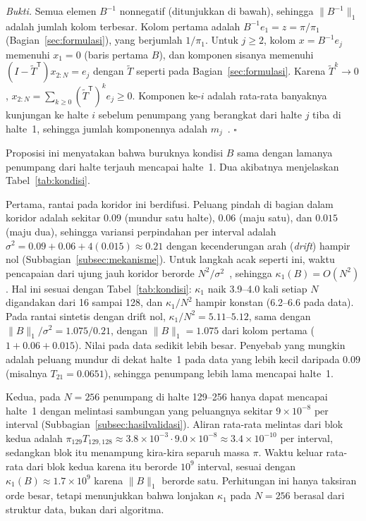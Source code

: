 \documentclass[12pt,a4paper]{article}
\newcommand{\T}{\mathsf{T}}
\numberwithin{equation}{section}
\begin{document}
\smallskip\noindent\emph{Bukti.}
Semua elemen $B^{-1}$ nonnegatif (ditunjukkan di bawah), sehingga $\lVert B^{-1}\rVert_1$ adalah jumlah kolom terbesar.
Kolom pertama adalah $B^{-1}e_1=z=\pi/\pi_1$ (Bagian~\ref{sec:formulasi}), yang berjumlah $1/\pi_1$. Untuk $j\ge2$, kolom
$x=B^{-1}e_j$ memenuhi $x_1=0$ (baris pertama $B$), dan komponen sisanya memenuhi
$(I-\widetilde T^\T)x_{2:N}=e_j$ dengan $\widetilde T$ seperti pada Bagian~\ref{sec:formulasi}. Karena $\widetilde T^k\to0$,
$x_{2:N}=\sum_{k\ge0}(\widetilde T^\T)^ke_j\ge0$. Komponen ke-$i$ adalah rata-rata banyaknya kunjungan ke halte $i$
sebelum penumpang yang berangkat dari halte $j$ tiba di halte~1, sehingga jumlah komponennya adalah $m_j$~\cite{norris}.
\hfill$\square$

\medskip
Proposisi ini menyatakan bahwa buruknya kondisi $B$ sama dengan lamanya penumpang dari halte terjauh mencapai halte~1.
Dua akibatnya menjelaskan Tabel~\ref{tab:kondisi}.

Pertama, rantai pada koridor ini berdifusi. Peluang pindah di bagian dalam koridor adalah sekitar $0.09$ (mundur satu
halte), $0.06$ (maju satu), dan $0.015$ (maju dua), sehingga variansi perpindahan per interval adalah
$\sigma^2=0.09+0.06+4(0.015)\approx0.21$ dengan kecenderungan arah (\emph{drift}) hampir nol
(Subbagian~\ref{subsec:mekanisme}). Untuk langkah acak seperti ini, waktu pencapaian dari ujung jauh koridor
berorde $N^2/\sigma^2$~\cite{norris}, sehingga $\kappa_1(B)=O(N^2)$. Hal ini sesuai dengan Tabel~\ref{tab:kondisi}:
$\kappa_1$ naik 3.9--4.0 kali setiap $N$ digandakan dari 16 sampai 128, dan $\kappa_1/N^2$ hampir konstan (6.2--6.6 pada data). Pada rantai
sintetis dengan drift nol, $\kappa_1/N^2=5.11$--$5.12$, sama dengan $\lVert B\rVert_1/\sigma^2=1.075/0.21$, dengan $\lVert B\rVert_1=1.075$ dari kolom pertama
($1+0.06+0.015$). Nilai pada data sedikit lebih besar. Penyebab yang mungkin adalah peluang mundur di dekat halte~1 pada
data yang lebih kecil daripada $0.09$ (misalnya $T_{21}=0.0651$), sehingga penumpang lebih lama mencapai halte~1.

Kedua, pada $N=256$ penumpang di halte 129--256 hanya dapat mencapai halte~1 dengan melintasi sambungan yang peluangnya
sekitar $9\times10^{-8}$ per interval (Subbagian~\ref{subsec:hasilvalidasi}). Aliran rata-rata melintas dari blok kedua
adalah $\pi_{129}T_{129,128}\approx3.8\times10^{-3}\cdot9.0\times10^{-8}\approx3.4\times10^{-10}$ per interval, sedangkan
blok itu menampung kira-kira separuh massa $\pi$. Waktu keluar rata-rata dari blok kedua karena itu berorde $10^{9}$
interval, sesuai dengan $\kappa_1(B)\approx1.7\times10^{9}$ karena $\lVert B\rVert_1$ berorde satu. Perhitungan ini
hanya taksiran orde besar, tetapi menunjukkan bahwa lonjakan $\kappa_1$ pada $N=256$ berasal dari struktur data, bukan dari
algoritma.
\end{document}
